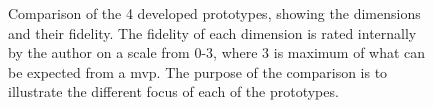 \documentclass[pdftex,10pt,b5paper,twoside]{report}
\begin{document}
\begin{figure}[h!]%
    \centering
    
    \qquad
    
    \qquad
    
    
    \caption{Comparison of the 4 developed prototypes, showing the dimensions and their fidelity. The fidelity of each dimension is rated internally by the author on a scale from 0-3, where 3 is maximum of what can be expected from a \gls{mvp}. The purpose of the comparison is to illustrate the different focus of each of the prototypes.}
    \label{fig:radar-chart}
\end{figure}
\end{document}
